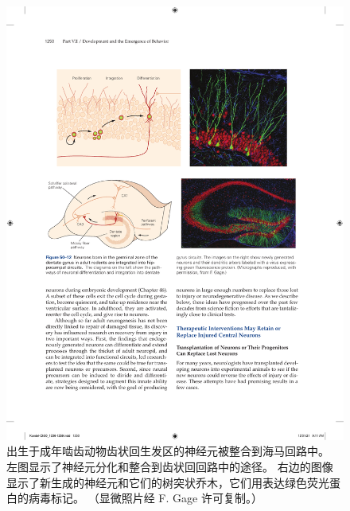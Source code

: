 \begin{figure}[htbp]
	\centering
	\includegraphics[width=0.95\linewidth]{chap50/fig_50_12}
	\caption{出生于成年啮齿动物齿状回生发区的神经元被整合到海马回路中。 左图显示了神经元分化和整合到齿状回回路中的途径。 右边的图像显示了新生成的神经元和它们的树突状乔木，它们用表达绿色荧光蛋白的病毒标记。 （显微照片经 F. Gage 许可复制。）}
	\label{fig:50_12}
\end{figure}

